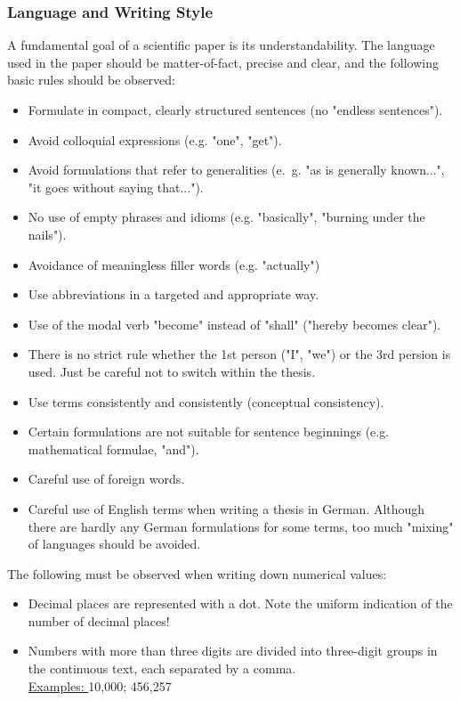 \subsubsection{Language and Writing Style}
A fundamental goal of a scientific paper is its understandability. The language used in the paper should be matter-of-fact, precise and clear, and the following basic rules should be observed:
\begin{itemize}
    \item Formulate in compact, clearly structured sentences (no "endless sentences").
    \item Avoid colloquial expressions (e.g. "one", "get").
    \item Avoid formulations that refer to generalities (e.~g. "as is generally known...", "it goes without saying that..."). 
    \item No use of empty phrases and idioms (e.g. "basically", "burning under the nails").
    \item Avoidance of meaningless filler words (e.g. "actually")
    \item Use abbreviations in a targeted and appropriate way. 
    \item Use of the modal verb "become" instead of "shall" ("hereby becomes clear"). 
    \item There is no strict rule whether the 1st person ("I", "we") or the 3rd persion is used. Just be careful not to switch within the thesis.
    \item Use terms consistently and consistently (conceptual consistency).
    \item Certain formulations are not suitable for sentence beginnings (e.g. mathematical formulae, "and").
    \item Careful use of foreign words.
    \item Careful use of English terms when writing a thesis in German. Although there are hardly any German formulations for some terms, too much "mixing" of languages should be avoided.
\end{itemize}

The following must be observed when writing down numerical values: 
\begin{itemize}
    \item Decimal places are represented with a dot. Note the uniform indication of the number of decimal places!
    \item Numbers with more than three digits are divided into three-digit groups in the continuous text, each separated by a comma.\\
   \uline{Examples: } 10,000; 456,257
\end{itemize}

